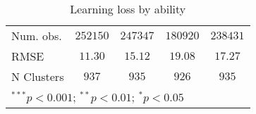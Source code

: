 \begin{table}
\begin{center}
\begin{tabular}{l c c c c}
Num. obs.                    & $252150$      & $247347$      & $180920$      & $238431$      \\
RMSE                         & $11.30$       & $15.12$       & $19.08$       & $17.27$       \\
N Clusters                   & $937$         & $935$         & $926$         & $935$         \\
\hline
\multicolumn{5}{l}{\scriptsize{$^{***}p<0.001$; $^{**}p<0.01$; $^{*}p<0.05$}}
\end{tabular}
\caption{Learning loss by ability}
\label{tableability}
\end{center}
\end{table}
